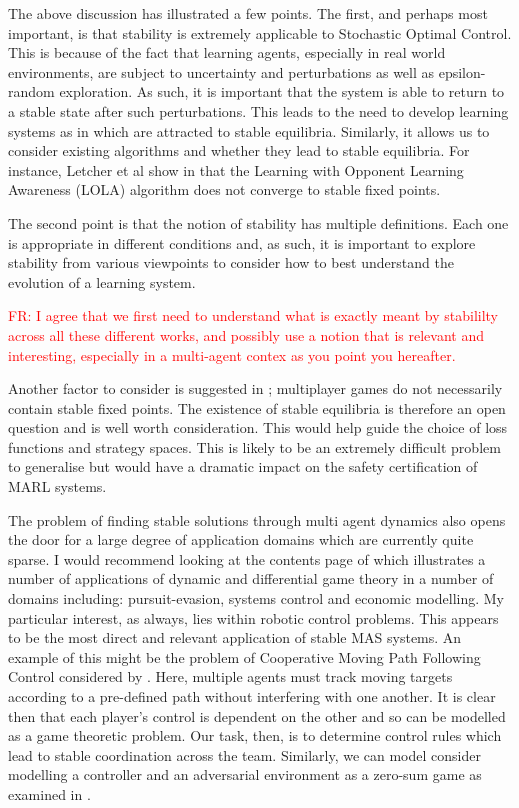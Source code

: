 \documentclass[preprint,11pt]{report}
\newcommand\fr[1]{\textcolor{red}{FR: #1}}
\begin{document}
The above discussion has illustrated a few points. The first, and perhaps most important, is that
stability is extremely applicable to Stochastic Optimal Control. This is because of the fact
that learning agents, especially in real world environments, are subject to uncertainty and
perturbations as well as epsilon-random exploration. As such, it is important that the system is
able to return to a stable state after such perturbations. This leads to the need to develop
learning systems as in \cite{Letcher2019DifferentiableMechanics} which are attracted to stable
equilibria. Similarly, it allows us to consider existing algorithms and whether they lead to stable
equilibria. For instance, Letcher et al show in \cite{LetcherSTABLEGAMES} that the Learning with
Opponent Learning Awareness (LOLA) algorithm \cite{Foerster2018LearningAwareness} does not converge
to stable fixed points.

The second point is that the notion of stability has multiple definitions. Each one is appropriate
in different conditions and, as such, it is important to explore stability from various viewpoints
to consider how to best understand the evolution of a learning system.

\fr{I agree that we first need to understand what is exactly meant by
  stabililty across all these different works, and possibly use a
  notion that is relevant and interesting, especially in a multi-agent
  contex as you point you hereafter.}

Another factor to consider is suggested in \cite{Milchtaich2007StaticGames}; multiplayer games do
not necessarily contain stable fixed points. The existence of stable equilibria is therefore an open
question and is well worth consideration. This would help guide the choice of loss functions and
strategy spaces. This is likely to be an extremely difficult problem to generalise but would have a
dramatic impact on the safety certification of MARL systems.

The problem of finding stable solutions through multi agent dynamics also opens the door for a large
degree of application domains which are currently quite sparse. I would recommend looking at the
contents page of \cite{Hamalainen1991DifferentialFinland} which illustrates a number of applications
of dynamic and differential game theory in a number of domains including: pursuit-evasion, systems
control and economic modelling. My particular interest, as always, lies within robotic control
problems. This appears to be the most direct and relevant application of stable MAS systems. An
example of this might be the problem of Cooperative Moving Path Following Control considered by
\cite{Reis2019RobustVehicles}. Here, multiple agents must track moving targets according to a
pre-defined path without interfering with one another. It is clear then that each player's control
is dependent on the other and so can be modelled as a game theoretic problem. Our task, then, is to
determine control rules which lead to stable coordination across the team. Similarly, we can model
consider modelling a controller and an adversarial environment as a zero-sum game as examined in
\cite{Marden2018AnnualControl}. 
\end{document}
